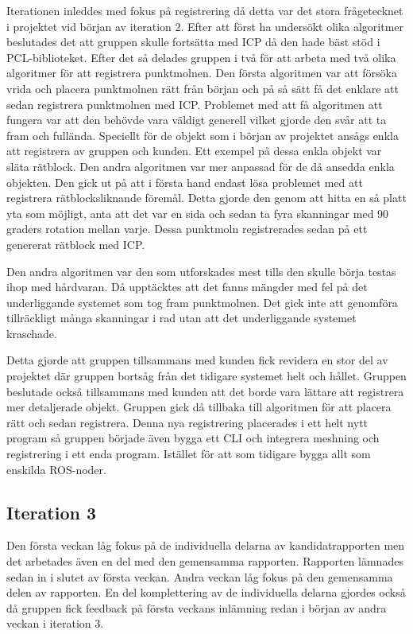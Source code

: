Iterationen inleddes med fokus på registrering då detta var det stora frågetecknet i projektet vid början av iteration 2. Efter att först ha undersökt olika algoritmer beslutades det att gruppen skulle fortsätta med ICP då den hade bäst stöd i PCL-biblioteket. Efter det så delades gruppen i två för att arbeta med två olika algoritmer för att registrera punktmolnen. Den första algoritmen var att försöka vrida och placera punktmolnen rätt från början och på så sätt få det enklare att sedan registrera punktmolnen med ICP. Problemet med att få algoritmen att fungera var att den behövde vara väldigt generell vilket gjorde den svår att ta fram och fullända. Speciellt för de objekt som i början av projektet ansågs enkla att registrera av gruppen och kunden. Ett exempel på dessa enkla objekt var släta rätblock. Den andra algoritmen var mer anpassad för de då ansedda enkla objekten. Den gick ut på att i första hand endast lösa problemet med att registrera rätblocksliknande föremål. Detta gjorde den genom att hitta en så platt yta som möjligt, anta att det var en sida och sedan ta fyra skanningar med 90 graders rotation mellan varje. Dessa punktmoln registrerades sedan på ett genererat rätblock med ICP.

Den andra algoritmen var den som utforskades mest tills den skulle börja testas ihop med hårdvaran. Då upptäcktes att det fanns mängder med fel på det underliggande systemet som tog fram punktmolnen. Det gick inte att genomföra tillräckligt många skanningar i rad utan att det underliggande systemet kraschade. 

Detta gjorde att gruppen tillsammans med kunden fick revidera en stor del av projektet där gruppen bortsåg från det tidigare systemet helt och hållet. Gruppen beslutade också tillsammans med kunden att det borde vara lättare att registrera mer detaljerade objekt. Gruppen gick då tillbaka till algoritmen för att placera rätt och sedan registrera. Denna nya registrering placerades i ett helt nytt program så gruppen började även bygga ett CLI och integrera meshning och registrering i ett enda program. Istället för att som tidigare bygga allt som enskilda ROS-noder.

\subsection{Iteration 3}

Den första veckan låg fokus på de individuella delarna av kandidatrapporten men det arbetades även en del med den gemensamma rapporten. Rapporten lämnades sedan in i slutet av första veckan. Andra veckan låg fokus på den gemensamma delen av rapporten. En del komplettering av de individuella delarna gjordes också då gruppen fick feedback på första veckans inlämning redan i början av andra veckan i iteration 3.


